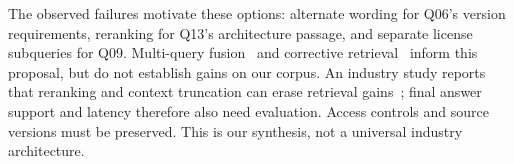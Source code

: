 \documentclass[12pt,a4paper]{article}
\begin{document}
The observed failures motivate these options: alternate wording for Q06's version requirements, reranking for Q13's architecture passage, and separate license subqueries for Q09. Multi-query fusion~\cite{ragfusion} and corrective retrieval~\cite{crag} inform this proposal, but do not establish gains on our corpus. An industry study reports that reranking and context truncation can erase retrieval gains~\cite{industryfusion}; final answer support and latency therefore also need evaluation. Access controls and source versions must be preserved. This is our synthesis, not a universal industry architecture.
\end{document}
